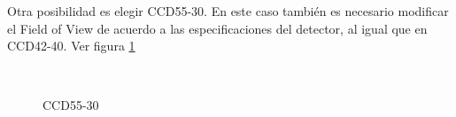\documentclass[a4paper,10pt]{article}
\begin{document}
Otra posibilidad es elegir CCD55-30. En este caso también es necesario
modificar el Field of View de acuerdo a las especificaciones del detector, al igual que en CCD42-40.  Ver
figura \ref{fig:ccd50p2}
\begin{figure}[ht!]
  \centering
  ~ 
  ~ 
  \caption{CCD55-30}
  \label{fig:ccd50p2}
\end{figure}
\end{document}
